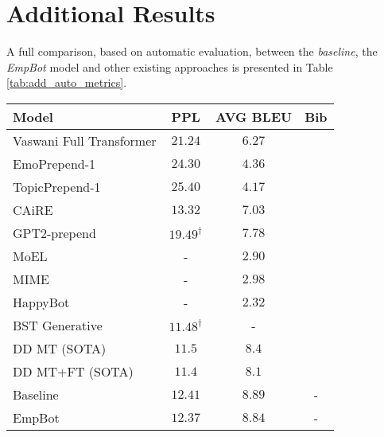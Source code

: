 \documentclass[11pt]{article}
\begin{document}
\section{Additional Results}\label{sec:add_results}
A full comparison,  based on automatic evaluation, between the \textit{baseline}, the \textit{EmpBot} model and other existing approaches is presented in Table \ref{tab:add_auto_metrics}.
\begin{table*}[t!]
\centering
\begin{tabular}{lccc}
\hline
Model &  PPL &  AVG BLEU & Bib \\
\hline
Vaswani Full Transformer & $21.24$  & $6.27$ & \citep{rashkin_2018_empathetic_dataset}\\
EmoPrepend-1  & $24.30$ & $4.36$ & \citep{rashkin_2018_empathetic_dataset}\\ 
TopicPrepend-1  & $25.40$ & $4.17$ & \citep{rashkin_2018_empathetic_dataset}\\ 
CAiRE & $13.32$ & $7.03$ & \citep{lin_2019_caire_empathetic_chatbot}\\
GPT2-prepend  & $19.49^{\dagger}$ & $7.78$ & \citep{santhanam_2019_emotional_nlg}\\
MoEL & - & $2.90$ & \citep{lin_2019_moel} \\
MIME & - & $2.98$ & \citep{majumder_2020_mime} \\
HappyBot & - & $2.32$ & \citep{Shin_2019_happybot} \\
BST Generative & $11.48^{\dagger}$ & - & \citep{roller_2020_fb_recipes_blender}\\
DD MT (SOTA) & $11.5$ & $8.4$ & \citep{shuster_2019_dodeca_dialogues}\\
DD MT+FT (SOTA)& $\mathbf{11.4}$ & $8.1$ & \citep{shuster_2019_dodeca_dialogues}\\
Baseline & $12.41$  &  $\mathbf{8.89}$ & -  \\ 
EmpBot  &  $12.37$ & $\mathbf{8.84}$ & - \\\hline
\end{tabular}
\caption{Test performance for automated metrics of the existing approaches, our \textit{baseline} and the \textit{EmpBot} model. Automated metrics noted with $\dagger$ were reported only on validation set.}
\label{tab:add_auto_metrics}
\end{table*}
\end{document}

